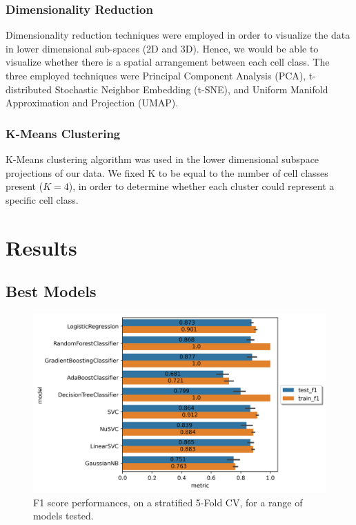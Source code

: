 \documentclass{IEEEtran}
\begin{document}
\subsubsection{Dimensionality Reduction}
Dimensionality reduction techniques were employed in order to visualize the data in lower dimensional sub-spaces (2D and 3D). Hence, we would be able to visualize whether there is a spatial arrangement between each cell class. The three employed techniques were Principal Component Analysis (PCA), t-distributed Stochastic Neighbor Embedding (t-SNE), and Uniform Manifold Approximation and Projection (UMAP).

\subsubsection{K-Means Clustering}
K-Means clustering algorithm was used in the lower dimensional subspace projections of our data. We fixed K to be equal to the number of cell classes present ($K=4$), in order to determine whether each cluster could represent a specific cell class.



\section{Results}

\subsection{Best Models}

\begin{figure}[h!]
  \centering
  \includegraphics[width=\columnwidth]{figures/models_unturned_f1.png}
  \caption{F1 score performances, on a stratified 5-Fold CV, for a range of models tested.}
  \label{fig:models_untuned}
\end{figure}
\end{document}
